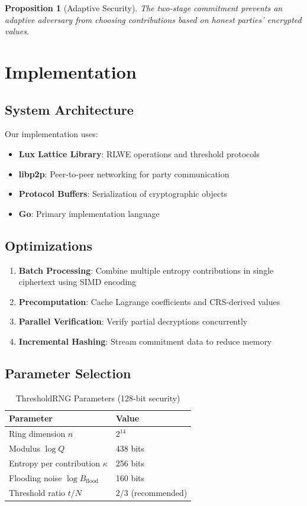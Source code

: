 \documentclass[11pt,a4paper]{article}
\newtheorem{proposition}[theorem]{Proposition}
\begin{document}
\begin{proposition}[Adaptive Security]
The two-stage commitment prevents an adaptive adversary from choosing contributions based on honest parties' encrypted values.
\end{proposition}

\section{Implementation}

\subsection{System Architecture}

Our implementation uses:
\begin{itemize}
    \item \textbf{Lux Lattice Library}: RLWE operations and threshold protocols
    \item \textbf{libp2p}: Peer-to-peer networking for party communication
    \item \textbf{Protocol Buffers}: Serialization of cryptographic objects
    \item \textbf{Go}: Primary implementation language
\end{itemize}

\subsection{Optimizations}

\begin{enumerate}
    \item \textbf{Batch Processing}: Combine multiple entropy contributions in single ciphertext using SIMD encoding
    \item \textbf{Precomputation}: Cache Lagrange coefficients and CRS-derived values
    \item \textbf{Parallel Verification}: Verify partial decryptions concurrently
    \item \textbf{Incremental Hashing}: Stream commitment data to reduce memory
\end{enumerate}

\subsection{Parameter Selection}

\begin{table}[h]
\centering
\caption{ThresholdRNG Parameters (128-bit security)}
\begin{tabular}{@{}ll@{}}
\toprule
Parameter & Value \\
\midrule
Ring dimension $n$ & $2^{14}$ \\
Modulus $\log Q$ & 438 bits \\
Entropy per contribution $\kappa$ & 256 bits \\
Flooding noise $\log B_{\text{flood}}$ & 160 bits \\
Threshold ratio $t/N$ & $2/3$ (recommended) \\
\bottomrule
\end{tabular}
\end{table}
\end{document}
